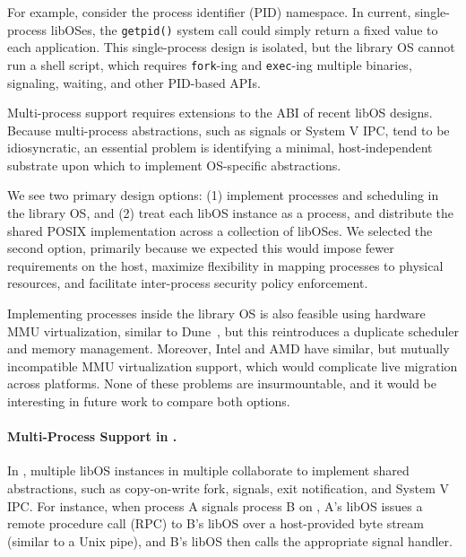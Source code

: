
For example,
consider the process identifier (PID) namespace.
In current, single-process lib\-OSes, 
the {\tt getpid()} system call could simply return a fixed value to each application.
This  single-process design is isolated,
but the library OS cannot run a shell script, which requires {\tt fork}-ing and {\tt exec}-ing multiple binaries, signaling, waiting, and other
PID-based APIs.

\vspace{5pt}
Multi-process  support requires extensions to the \pal{} ABI of recent libOS designs.
Because multi-process abstractions, 
such as signals or System V IPC, 
tend to be idiosyncratic,
an essential problem is identifying a minimal, host-independent
substrate upon which 
to implement OS-specific abstractions.

We see two primary design options:
(1) implement processes and scheduling in 
the library OS, and (2) treat each libOS instance as a process, and distribute the 
shared POSIX implementation across a collection of libOSes.
We selected the second option, primarily because we expected this would impose fewer
requirements on the host, maximize flexibility in mapping processes 
to physical resources, and facilitate inter-process security policy enforcement. %

Implementing processes
inside the library OS is also feasible using 
hardware MMU virtualization, similar to Dune~\citep{belay12dune},
but this reintroduces a duplicate scheduler and memory management.
Moreover, Intel and AMD have similar, but mutually incompatible MMU virtualization support,
which would complicate live migration across platforms.
None of these problems are insurmountable, and it would be interesting in future
work to compare both options.

\paragraph{Multi-Process Support in \sysname{}.}
In \sysname{}, multiple libOS instances in multiple \picoprocs{} collaborate to 
implement shared abstractions, such as 
 copy-on-write fork, signals, exit notification,
and System V IPC.
For instance, when process A signals process B on \sysname{}, A's libOS issues
a remote procedure call (RPC) to B's libOS over a host-provided byte stream (similar to a Unix pipe),
and B's libOS then calls the appropriate signal handler.

